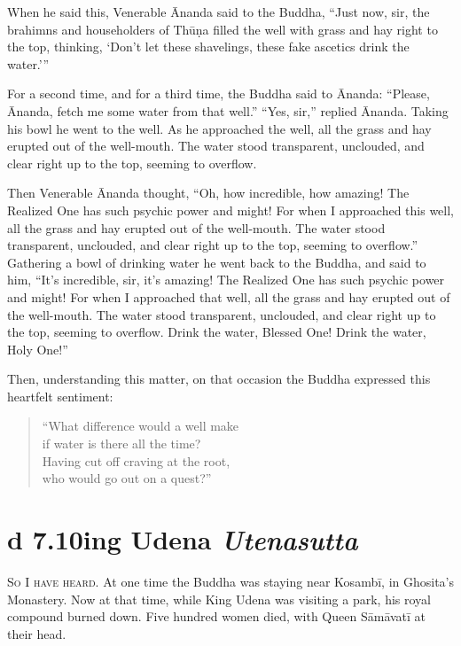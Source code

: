\documentclass[12pt,openany]{book}%
\newcommand*{\suttatitleacronym}[1]{\smaller[2]{#1}\vspace*{.3em}}
\newcommand*{\suttatitletranslation}[1]{\linebreak{#1}}
\newcommand*{\suttatitleroot}[1]{\linebreak\smaller[2]\itshape{#1}}
\newcommand*{\tocacronym}[1]{\hspace*{-3.3em}{#1}\quad}
\newcommand*{\toctranslation}[1]{#1}
\newcommand*{\tocroot}[1]{(\textit{#1})}
\newcommand*{\scevam}[1]{\textsc{#1}}
\begin{document}
When he said this, Venerable Ānanda said to the Buddha, “Just now, sir, the brahimns and householders of \textsanskrit{Thūṇa} filled the well with grass and hay right to the top, thinking, ‘Don’t let these shavelings, these fake ascetics drink the water.’” 

For a second time, and for a third time, the Buddha said to Ānanda: “Please, Ānanda, fetch me some water from that well.” “Yes, sir,” replied Ānanda. Taking his bowl he went to the well. As he approached the well, all the grass and hay erupted out of the well-mouth. The water stood transparent, unclouded, and clear right up to the top, seeming to overflow. 

Then Venerable Ānanda thought, “Oh, how incredible, how amazing! The Realized One has such psychic power and might! For when I approached this well, all the grass and hay erupted out of the well-mouth. The water stood transparent, unclouded, and clear right up to the top, seeming to overflow.” Gathering a bowl of drinking water he went back to the Buddha, and said to him, “It’s incredible, sir, it’s amazing! The Realized One has such psychic power and might! For when I approached that well, all the grass and hay erupted out of the well-mouth. The water stood transparent, unclouded, and clear right up to the top, seeming to overflow. Drink the water, Blessed One! Drink the water, Holy One!” 

Then, understanding this matter, on that occasion the Buddha expressed this heartfelt sentiment: 

\begin{verse}%
“What difference would a well make \\
if water is there all the time? \\
Having cut off craving at the root, \\
who would go out on a quest?” 

%
\end{verse}

%
\section*{{\suttatitleacronym Ud 7.10}{\suttatitletranslation King Udena }{\suttatitleroot Utenasutta}}
\addcontentsline{toc}{section}{\tocacronym{Ud 7.10} \toctranslation{King Udena } \tocroot{Utenasutta}}

\scevam{So I have heard. }At one time the Buddha was staying near \textsanskrit{Kosambī}, in Ghosita’s Monastery. Now at that time, while King Udena was visiting a park, his royal compound burned down. Five hundred women died, with Queen \textsanskrit{Sāmāvatī} at their head. 
\end{document}

